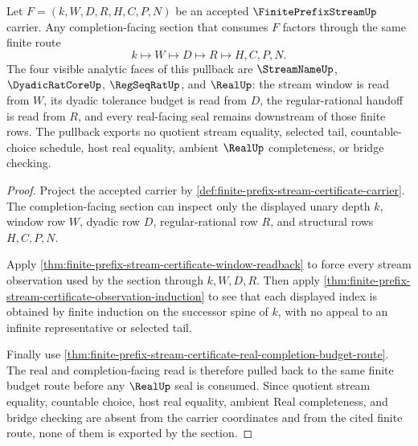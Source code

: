 \begin{theorem}
\label{thm:finite-prefix-stream-completion-section-pullback}
Let $F=(k,W,D,R,H,C,P,N)$ be an accepted $\FinitePrefixStreamUp$ carrier. Any completion-facing section that consumes $F$ factors through the same finite route
$$
k \longmapsto W \longmapsto D \longmapsto R \longmapsto H,C,P,N .
$$
The four visible analytic faces of this pullback are $\StreamNameUp$, $\DyadicRatCoreUp$, $\RegSeqRatUp$, and $\RealUp$: the stream window is read from $W$, its dyadic tolerance budget is read from $D$, the regular-rational handoff is read from $R$, and every real-facing seal remains downstream of those finite rows. The pullback exports no quotient stream equality, selected tail, countable-choice schedule, host real equality, ambient $\RealUp$ completeness, or bridge checking.
\end{theorem}
\begin{proof}
Project the accepted carrier by \autoref{def:finite-prefix-stream-certificate-carrier}. The completion-facing section can inspect only the displayed unary depth $k$, window row $W$, dyadic row $D$, regular-rational row $R$, and structural rows $H,C,P,N$.

Apply \autoref{thm:finite-prefix-stream-certificate-window-readback} to force every stream observation used by the section through $k,W,D,R$. Then apply \autoref{thm:finite-prefix-stream-certificate-observation-induction} to see that each displayed index is obtained by finite induction on the successor spine of $k$, with no appeal to an infinite representative or selected tail.

Finally use \autoref{thm:finite-prefix-stream-certificate-real-completion-budget-route}. The real and completion-facing read is therefore pulled back to the same finite budget route before any $\RealUp$ seal is consumed. Since quotient stream equality, countable choice, host real equality, ambient Real completeness, and bridge checking are absent from the carrier coordinates and from the cited finite route, none of them is exported by the section.
\end{proof}

